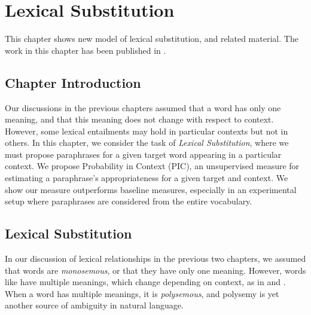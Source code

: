 \chapter{Lexical Substitution}
\label{ch:lexsub}

This chapter shows new model of lexical substitution, and related
material. The work in this chapter has been published in
.

\section{Chapter Introduction}


Our discussions in the previous chapters assumed that a word has only one
meaning, and that this meaning does not change with respect to context.
However, some lexical entailments may hold in particular contexts but not
in others. In this chapter, we consider the task of {\em Lexical Substitution},
where we must propose paraphrases for a given target word appearing in
a particular context. We propose Probability in Context (PIC), an unsupervised
measure for estimating a paraphrase's appropriateness for a given target and
context. We show our measure outperforms baseline measures, especially in an
experimental setup where paraphrases are considered from the entire vocabulary.

\section{Lexical Substitution}

In our discussion of lexical relationships in the previous two chapters, we
assumed that words are {\em monosemous}, or that they have only one meaning.
However, words like  have multiple meanings, which change depending
on context, as in  and . When a word has
multiple meanings, it is {\em polysemous}, and polysemy is yet another source
of ambiguity in natural language.

